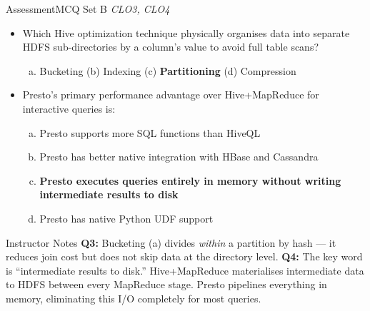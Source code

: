 \documentclass[aspectratio=169,10pt]{beamer}
\begin{document}
\begin{frame}{Assessment\textemdash MCQ Set B \hfill\small\textit{CLO3, CLO4}}
  \vspace{6pt}
  \begin{itemize}
    \item[\textbf{Q3.}] Which Hive optimization technique physically organises data into separate HDFS sub-directories by a column's value to avoid full table scans?
    \begin{enumerate}[(a)]
      \item Bucketing \quad (b) Indexing \quad (c) \textbf{Partitioning} \quad (d) Compression
    \end{enumerate}
  \end{itemize}
  \vspace{8pt}
  \begin{itemize}
    \item[\textbf{Q4.}] Presto's primary performance advantage over Hive+MapReduce for interactive queries is:
    \begin{enumerate}[(a)]
      \item Presto supports more SQL functions than HiveQL
      \item Presto has better native integration with HBase and Cassandra
      \item \textbf{Presto executes queries entirely in memory without writing intermediate results to disk}
      \item Presto has native Python UDF support
    \end{enumerate}
  \end{itemize}
  \vspace{8pt}
  \begin{alertblock}{Instructor Notes}
    \textbf{Q3:} Bucketing (a) divides \textit{within} a partition by hash --- it reduces join cost but does not skip data at the directory level.  \textbf{Q4:} The key word is ``intermediate results to disk.''  Hive+MapReduce materialises intermediate data to HDFS between every MapReduce stage.  Presto pipelines everything in memory, eliminating this I/O completely for most queries.
  \end{alertblock}
\end{frame}
\end{document}

